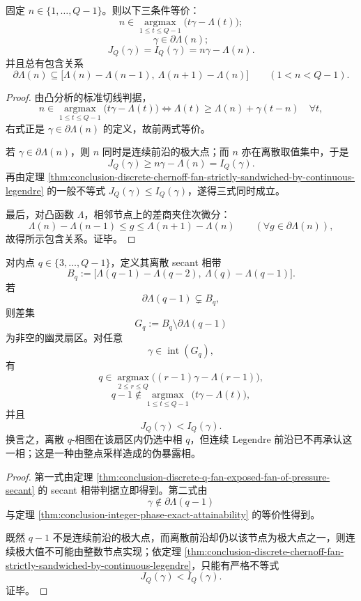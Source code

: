 \begin{theorem}[整数相的精确可达性判据]\label{thm:conclusion-integer-phase-exact-attainability}
固定 \(n\in\{1,\dots,Q-1\}\)。则以下三条件等价：
\[
n\in \operatorname*{argmax}_{1\le t\le Q-1}\bigl(t\gamma-\Lambda(t)\bigr);
\]
\[
\gamma\in \partial \Lambda(n);
\]
\[
J_Q(\gamma)=I_Q(\gamma)=n\gamma-\Lambda(n).
\]
并且总有包含关系
\[
\partial \Lambda(n)\subseteq
\bigl[\Lambda(n)-\Lambda(n-1),\ \Lambda(n+1)-\Lambda(n)\bigr]
\qquad
(1<n<Q-1).
\]
\end{theorem}
\begin{proof}
由凸分析的标准切线判据，
\[
n\in\operatorname*{argmax}_{1\le t\le Q-1}\bigl(t\gamma-\Lambda(t)\bigr)
\iff
\Lambda(t)\ge \Lambda(n)+\gamma(t-n)\quad \forall t,
\]
右式正是 \(\gamma\in\partial\Lambda(n)\) 的定义，故前两式等价。

若 \(\gamma\in\partial\Lambda(n)\)，则 \(n\) 同时是连续前沿的极大点；而 \(n\) 亦在离散取值集中，于是
\[
J_Q(\gamma)\ge n\gamma-\Lambda(n)=I_Q(\gamma).
\]
再由定理 \ref{thm:conclusion-discrete-chernoff-fan-strictly-sandwiched-by-continuous-legendre} 的一般不等式 \(J_Q(\gamma)\le I_Q(\gamma)\)，遂得三式同时成立。

最后，对凸函数 \(\Lambda\)，相邻节点上的差商夹住次微分：
\[
\Lambda(n)-\Lambda(n-1)\le g\le \Lambda(n+1)-\Lambda(n)
\qquad
(\forall g\in\partial\Lambda(n)),
\]
故得所示包含关系。证毕。
\end{proof}

\begin{theorem}[幽灵扇区]\label{thm:conclusion-ghost-sector-for-discrete-secant-fan}
对内点 \(q\in\{3,\dots,Q-1\}\)，定义其离散 secant 相带
\[
B_q:=
\bigl[\Lambda(q-1)-\Lambda(q-2),\ \Lambda(q)-\Lambda(q-1)\bigr].
\]
若
\[
\partial \Lambda(q-1)\subsetneq B_q,
\]
则差集
\[
G_q:=B_q\setminus \partial \Lambda(q-1)
\]
为非空的幽灵扇区。对任意
\[
\gamma\in \operatorname{int}(G_q),
\]
有
\[
q\in \operatorname*{argmax}_{2\le r\le Q}\bigl((r-1)\gamma-\Lambda(r-1)\bigr),
\]
\[
q-1\notin \operatorname*{argmax}_{1\le t\le Q-1}\bigl(t\gamma-\Lambda(t)\bigr),
\]
并且
\[
J_Q(\gamma)<I_Q(\gamma).
\]
换言之，离散 \(q\)-相图在该扇区内仍选中相 \(q\)，但连续 Legendre 前沿已不再承认这一相；这是一种由整点采样造成的伪暴露相。
\end{theorem}
\begin{proof}
第一式由定理 \ref{thm:conclusion-discrete-q-fan-exposed-fan-of-pressure-secant} 的 secant 相带判据立即得到。第二式由
\[
\gamma\notin\partial\Lambda(q-1)
\]
与定理 \ref{thm:conclusion-integer-phase-exact-attainability} 的等价性得到。

既然 \(q-1\) 不是连续前沿的极大点，而离散前沿却仍以该节点为极大点之一，则连续极大值不可能由整数节点实现；依定理 \ref{thm:conclusion-discrete-chernoff-fan-strictly-sandwiched-by-continuous-legendre}，只能有严格不等式
\[
J_Q(\gamma)<I_Q(\gamma).
\]
证毕。
\end{proof}

